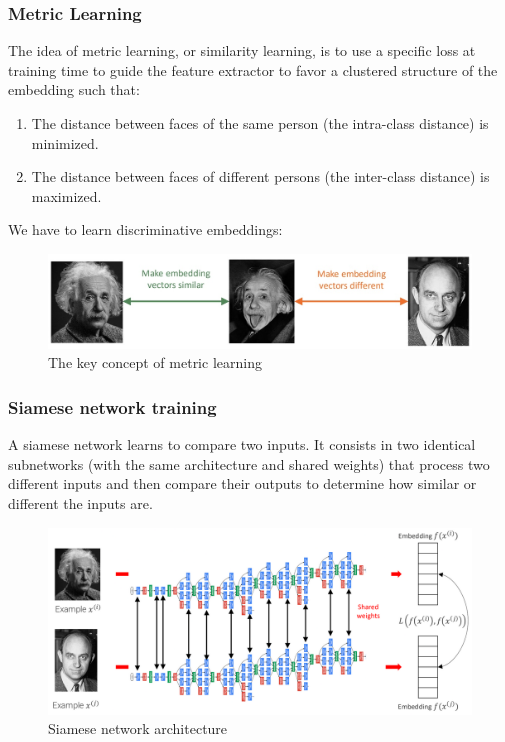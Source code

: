 \subsubsection{Metric Learning}
The idea of metric learning, or similarity learning, is to use a specific loss at training time to guide the feature extractor to favor a clustered structure of the embedding such that:
\begin{enumerate}
  \item The distance between faces of the same person (the intra-class distance) is minimized.
  \item The distance between faces of different persons (the inter-class distance) is maximized.
\end{enumerate}

We have to learn discriminative embeddings:

\begin{figure}[htbp]
  \centering
  \includegraphics[width=0.7\linewidth]{./img/metric_learning.jpg}
  \caption{The key concept of metric learning}
\end{figure}

\subsubsection{Siamese network training}
A siamese network learns to compare two inputs.
It consists in two identical subnetworks (with the same architecture and shared weights) that process two different inputs and then compare their outputs to determine how similar or different the inputs are.

\begin{figure}[htbp]
  \centering
  \includegraphics[width=0.7\linewidth]{./img/siamese_network.png}
  \caption{Siamese network architecture}
\end{figure}


